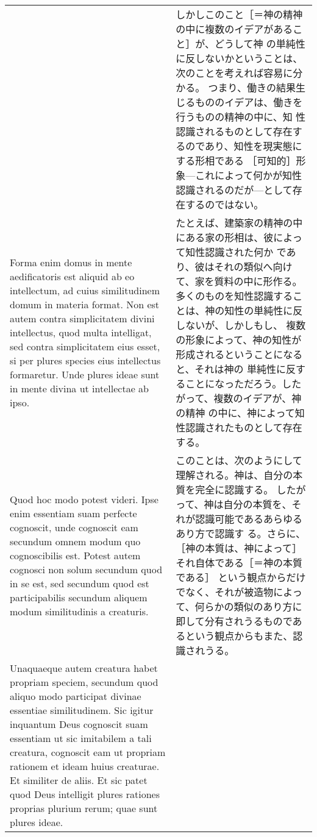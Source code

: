 \documentclass[10pt]{jsarticle} %
\begin{document}
\begin{longtable}{p{21em}p{21em}}
&

しかしこのこと［＝神の精神の中に複数のイデアがあること］が、どうして神
 の単純性に反しないかということは、次のことを考えれば容易に分かる。
 つまり、働きの結果生じるもののイデアは、働きを行うものの精神の中に、知
 性認識されるものとして存在するのであり、知性を現実態にする形相である
 ［可知的］形象---これによって何かが知性認識されるのだが---として存在するのではない。


\\


Forma enim domus in mente aedificatoris est aliquid ab eo
intellectum, ad cuius similitudinem domum in materia format. Non est
autem contra simplicitatem divini intellectus, quod multa intelligat,
sed contra simplicitatem eius esset, si per plures species eius
intellectus formaretur. Unde plures ideae sunt in mente divina ut
intellectae ab ipso. 


&

たとえば、建築家の精神の中にある家の形相は、彼によって知性認識された何か
 であり、彼はそれの類似へ向けて、家を質料の中に形作る。
多くのものを知性認識することは、神の知性の単純性に反しないが、しかしもし、
 複数の形象によって、神の知性が形成されるということになると、それは神の
 単純性に反することになっただろう。したがって、複数のイデアが、神の精神
 の中に、神によって知性認識されたものとして存在する。


\\


\hspace{1em}Quod hoc modo potest videri. Ipse enim essentiam
suam perfecte cognoscit, unde cognoscit eam secundum omnem modum quo
cognoscibilis est. Potest autem cognosci non solum secundum quod in se
est, sed secundum quod est participabilis secundum aliquem modum
similitudinis a creaturis. 

&

このことは、次のようにして理解される。神は、自分の本質を完全に認識する。
 したがって、神は自分の本質を、それが認識可能であるあらゆるあり方で認識す
 る。さらに、［神の本質は、神によって］それ自体である［＝神の本質である］
 という観点からだけでなく、それが被造物によって、何らかの類似のあり方に即して分有されうるものであるという観点からもまた、認識されうる。

\\



Unaquaeque autem creatura habet propriam
speciem, secundum quod aliquo modo participat divinae essentiae
similitudinem. Sic igitur inquantum Deus cognoscit suam essentiam ut sic
imitabilem a tali creatura, cognoscit eam ut propriam rationem et ideam
huius creaturae. Et similiter de aliis. Et sic patet quod Deus
intelligit plures rationes proprias plurium rerum; quae sunt plures
ideae.


\end{longtable}
\end{document}
